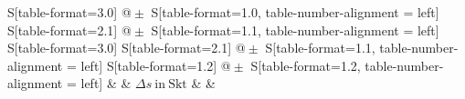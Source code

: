 \begin{table}[h!]
    \centering
    \caption{Kalium ($n=4,z=19$) -- Abschirmungszahl für jedes betrachtete Dublett, sowie bei der Berechnung verwendete Größen}
    \label{tab:Kalium}
    \begin{tabular}{
	S[table-format=3.0]
	@{${}\pm{}$}
	S[table-format=1.0, table-number-alignment = left]
	S[table-format=2.1]
	@{${}\pm{}$}
	S[table-format=1.1, table-number-alignment = left]
	S[table-format=3.0]
	S[table-format=2.1]
	@{${}\pm{}$}
	S[table-format=1.1, table-number-alignment = left]
	S[table-format=1.2]
	@{${}\pm{}$}
	S[table-format=1.2, table-number-alignment = left]
	}
	\toprule
			& 		& 
	{$\Delta s \ \mathrm{in} \ \mathrm{Skt}$}		& 		& 
			\\ 
	\midrule
    
    \bottomrule
    \end{tabular}
    \end{table}

